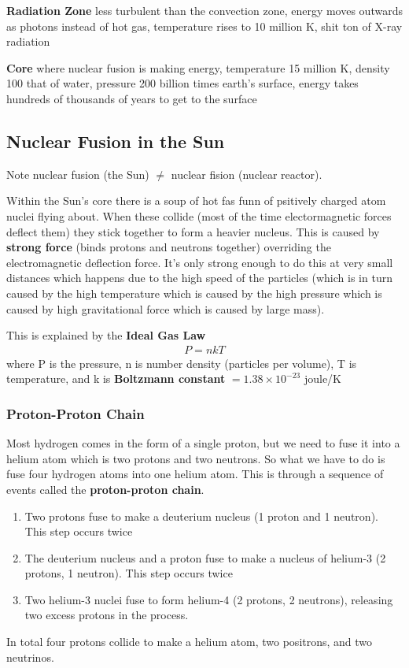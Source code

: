 \textbf{Radiation Zone} less turbulent than the convection zone, energy moves outwards as photons instead of hot gas, temperature rises to 10 million K, shit ton of X-ray radiation

\textbf{Core} where nuclear fusion is making energy, temperature 15 million K, density 100 that of water, pressure 200 billion times earth's surface, energy takes hundreds of thousands of years to get to the surface

\subsection{Nuclear Fusion in the Sun}
Note nuclear fusion (the Sun) $\not =$ nuclear fision (nuclear reactor).

Within the Sun's core there is a soup of hot fas funn of psitively charged atom nuclei flying about. When these collide (most of the time electormagnetic forces deflect them) they stick together to form a heavier nucleus. This is caused by \textbf{strong force} (binds protons and neutrons together) overriding the electromagnetic deflection force. It's only strong enough to do this at very small distances which happens due to the high speed of the particles (which is in turn caused by the high temperature which is caused by the high pressure which is caused by high gravitational force which is caused by large mass).

This is explained by the \textbf{Ideal Gas Law}
\begin{align*}
    P = nkT
\end{align*}
where P is the pressure, n is number density (particles per volume), T is temperature, and k is \textbf{Boltzmann constant} $=1.38 \times 10^{-23}$ joule/K

\subsubsection{Proton-Proton Chain}
Most hydrogen comes in the form of a single proton, but we need to fuse it into a helium atom which is two protons and two neutrons. So what we have to do is fuse four hydrogen atoms into one helium atom. This is through a sequence of events called the \textbf{proton-proton chain}.
\begin{enumerate}
\item Two protons fuse to make a deuterium nucleus (1 proton and 1 neutron). This step occurs twice
\item The deuterium nucleus and a proton fuse to make a nucleus of helium-3 (2 protons, 1 neutron). This step occurs twice
\item Two helium-3 nuclei fuse to form helium-4 (2 protons, 2 neutrons), releasing two excess protons in the process.
\end{enumerate}
In total four protons collide to make a helium atom, two positrons, and two neutrinos.

